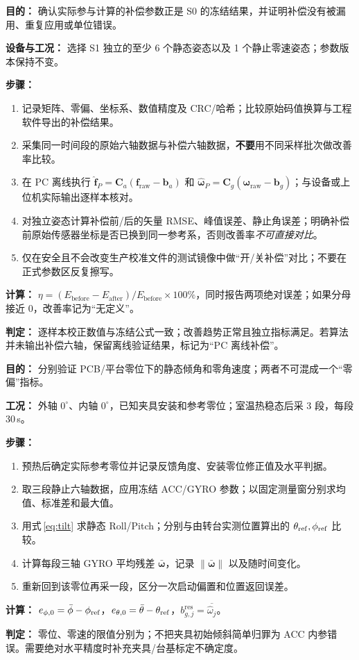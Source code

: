 \textbf{目的：} 确认实际参与计算的补偿参数正是 S0 的冻结结果，并证明补偿没有被漏用、重复应用或单位错误。
\par\textbf{设备与工况：} 选择 S1 独立的至少 6 个静态姿态以及 1 个静止零速姿态；参数版本保持不变。
\par\textbf{步骤：}
\begin{enumerate}
\item 记录矩阵、零偏、坐标系、数值精度及 CRC/哈希；比较原始码值换算与工程软件导出的补偿结果。
\item 采集同一时间段的原始六轴数据与补偿六轴数据，\textbf{不要}用不同采样批次做改善率比较。
\item 在 PC 离线执行 $\hat{\bm f}_P=\mathbf C_a(\bm f_\mathrm{raw}-\bm b_a)$ 和 $\hat{\bm\omega}_P=\mathbf C_g(\bm\omega_\mathrm{raw}-\bm b_g)$；与设备或上位机实际输出逐样本核对。
\item 对独立姿态计算补偿前/后的矢量 RMSE、峰值误差、静止角误差；明确补偿前原始传感器坐标是否已换到同一参考系，否则改善率\emph{不可直接对比}。
\item 仅在安全且不会改变生产校准文件的测试镜像中做“开/关补偿”对比；不要在正式参数区反复擦写。
\end{enumerate}
\textbf{计算：} $\eta=(E_\mathrm{before}-E_\mathrm{after})/E_\mathrm{before}\times100\%$，同时报告两项绝对误差；如果分母接近 0，改善率记为“无定义”。
\par\textbf{判定：} 逐样本校正数值与冻结公式一致；改善趋势正常且独立指标满足\pending。若算法并未输出补偿六轴，保留离线验证结果，标记为“PC 离线补偿”。

\textbf{目的：} 分别验证 PCB/平台零位下的静态倾角和零角速度；两者不可混成一个“零偏”指标。
\par\textbf{工况：} 外轴 $0^\circ$、内轴 $0^\circ$，已知夹具安装和参考零位；室温热稳态后采 3 段，每段 30\,s。
\par\textbf{步骤：}
\begin{enumerate}
\item 预热后确定实际参考零位并记录反馈角度、安装零位修正值及水平判据。
\item 取三段静止六轴数据，应用冻结 ACC/GYRO 参数；以固定测量窗分别求均值、标准差和最大值。
\item 用式\,\eqref{eq:tilt} 求静态 Roll/Pitch；分别与由转台实测位置算出的 $\theta_{\rm ref},\phi_{\rm ref}$ 比较。
\item 计算每段三轴 GYRO 平均残差 $\bar{\bm\omega}$，记录 $\|\bar{\bm\omega}\|$ 以及随时间变化。
\item 重新回到该零位再采一段，区分一次启动偏置和位置返回误差。
\end{enumerate}
\textbf{计算：} $e_{\phi,0}=\bar\phi-\phi_{\rm ref}$，$e_{\theta,0}=\bar\theta-\theta_{\rm ref}$，$b_{g,j}^\mathrm{res}=\overline{\hat\omega_j}$。
\par\textbf{判定：} 零位、零速的限值分别为\pending；不把夹具初始倾斜简单归罪为 ACC 内参错误。需要绝对水平精度时补充夹具/台基标定不确定度。

